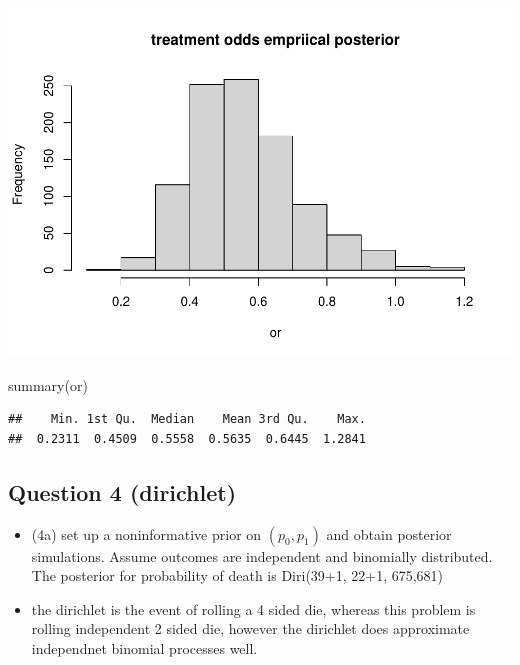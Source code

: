 \documentclass[
]{book}
\newenvironment{Shaded}{\begin{snugshade}}{\end{snugshade}}
\newcommand{\FunctionTok}[1]{\textcolor[rgb]{0.00,0.00,0.00}{#1}}
\newcommand{\NormalTok}[1]{#1}
\providecommand{\tightlist}{%
  \setlength{\itemsep}{0pt}\setlength{\parskip}{0pt}}
\theoremstyle{definition}
\theoremstyle{definition}
\theoremstyle{definition}
\theoremstyle{definition}
\theoremstyle{remark}
\begin{document}
\includegraphics{_main_files/figure-latex/unnamed-chunk-35-1.pdf}

\begin{Shaded}
\begin{Highlighting}[]
  \FunctionTok{summary}\NormalTok{(or)}
\end{Highlighting}
\end{Shaded}

\begin{verbatim}
##    Min. 1st Qu.  Median    Mean 3rd Qu.    Max. 
##  0.2311  0.4509  0.5558  0.5635  0.6445  1.2841
\end{verbatim}

\hypertarget{question-4-dirichlet}{%
\subsection*{Question 4 (dirichlet)}\label{question-4-dirichlet}}

\begin{itemize}
\tightlist
\item
  (4a) set up a noninformative prior on \((p_0,p_1)\) and obtain posterior simulations. Assume outcomes are independent and binomially distributed. The posterior for probability of death is Diri(39+1, 22+1, 675,681)
\item
  the dirichlet is the event of rolling a 4 sided die, whereas this problem is rolling independent 2 sided die, however the dirichlet does approximate independnet binomial processes well.
\end{itemize}
\end{document}
